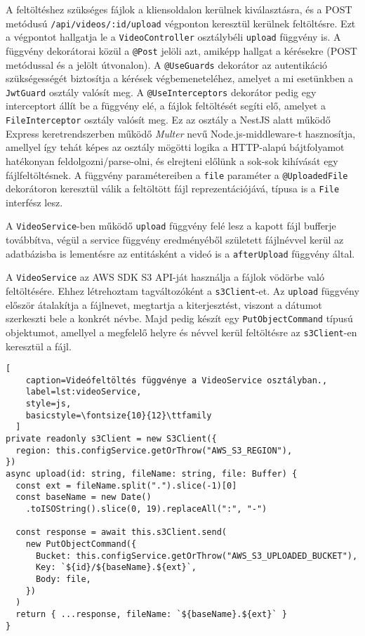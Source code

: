 A feltöltéshez szükséges fájlok a kliensoldalon kerülnek kiválasztásra, és a POST metódusú \verb|/api/videos/:id/upload| végponton keresztül kerülnek feltöltésre. Ezt a végpontot hallgatja le a \verb|VideoController| osztálybéli \verb|upload| függvény is. A függvény dekorátorai közül a \verb|@Post| jelöli azt, amiképp hallgat a kérésekre (POST metódussal és a jelölt útvonalon). A \verb|@UseGuards| dekorátor az autentikáció szükségességét biztosítja a kérések végbemeneteléhez, amelyet a mi esetünkben a \verb|JwtGuard| osztály valósít meg. A \verb|@UseInterceptors| dekorátor pedig egy interceptort állít be a függvény elé, a fájlok feltöltését segíti elő, amelyet a \verb|FileInterceptor| osztály valósít meg. Ez az osztály a NestJS alatt működő Express keretrendszerben működő \emph{Multer} nevű Node.js-middleware-t hasznosítja, amellyel így tehát képes az osztály mögötti logika a HTTP-alapú bájtfolyamot hatékonyan feldolgozni/parse-olni, és elrejteni előlünk a sok-sok kihívását egy fájlfeltöltésnek. A függvény paramétereiben a \verb|file| paraméter a \verb|@UploadedFile| dekorátoron keresztül válik a feltöltött fájl reprezentációjává, típusa is a \verb|File| interfész lesz.

A \verb|VideoService|-ben működő \verb|upload| függvény felé lesz a kapott fájl bufferje továbbítva, végül a service függvény eredményéből született fájlnévvel kerül az adatbázisba is lementésre az entitásként a videó is a \verb|afterUpload| függvény által.

A \verb|VideoService| az AWS SDK S3 API-ját használja a fájlok vödörbe való feltöltésére. Ehhez létrehoztam tagváltozóként a \verb|s3Client|-et. Az \verb|upload| függvény először átalakítja a fájlnevet, megtartja a kiterjesztést, viszont a dátumot szerkeszti bele a konkrét névbe. Majd pedig készít egy \verb|PutObjectCommand| típusú objektumot, amellyel a megfelelő helyre és névvel kerül feltöltésre az \verb|s3Client|-en keresztül a fájl.

\begin{minipage}{0.92\textwidth}
  \begin{lstlisting}[
    caption=Videófeltöltés függvénye a VideoService osztályban.,
    label=lst:videoService,
    style=js,
    basicstyle=\fontsize{10}{12}\ttfamily
  ]
private readonly s3Client = new S3Client({
  region: this.configService.getOrThrow("AWS_S3_REGION"),
})
async upload(id: string, fileName: string, file: Buffer) {
  const ext = fileName.split(".").slice(-1)[0]
  const baseName = new Date()
    .toISOString().slice(0, 19).replaceAll(":", "-")

  const response = await this.s3Client.send(
    new PutObjectCommand({
      Bucket: this.configService.getOrThrow("AWS_S3_UPLOADED_BUCKET"),
      Key: `${id}/${baseName}.${ext}`,
      Body: file,
    })
  )
  return { ...response, fileName: `${baseName}.${ext}` }
}
\end{lstlisting}
\end{minipage}
